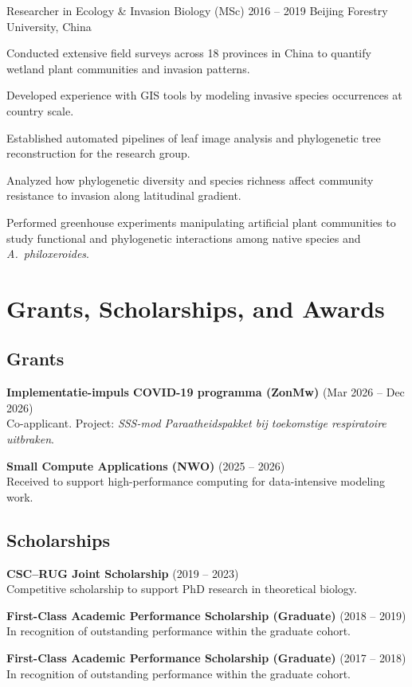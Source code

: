 \cventry
  {Researcher in Ecology \& Invasion Biology (MSc)}
  {2016 -- 2019}
  {Beijing Forestry University, China}
  {%
   \begin{expitem}
     \item Conducted extensive field surveys across 18 provinces in China to quantify wetland plant communities and invasion patterns.
     \item Developed experience with GIS tools by modeling invasive species occurrences at country scale.
     \item Established automated pipelines of leaf image analysis and phylogenetic tree reconstruction for the research group. 
     \item Analyzed how phylogenetic diversity and species richness affect community resistance to invasion along latitudinal gradient.
     \item Performed greenhouse experiments manipulating artificial plant communities to study functional and phylogenetic interactions among native species and \emph{A.~philoxeroides}.
   \end{expitem}
  }

\section*{Grants, Scholarships, and Awards}
\subsection*{Grants}
\begin{expitem}
\item \textbf{Implementatie-impuls COVID-19 programma (ZonMw)} (Mar 2026 -- Dec 2026)\\
      Co-applicant. Project: \emph{SSS-mod Paraatheidspakket bij toekomstige respiratoire uitbraken}.
  \item \textbf{Small Compute Applications (NWO)} (2025 -- 2026)\\
        Received to support high-performance computing for data-intensive modeling work.
\end{expitem}
\subsection*{Scholarships}
\begin{expitem}
  \item \textbf{CSC--RUG Joint Scholarship} (2019 -- 2023)\\
        Competitive scholarship to support PhD research in theoretical biology.
  \item \textbf{First-Class Academic Performance Scholarship (Graduate)} (2018 -- 2019)\\
        In recognition of outstanding performance within the graduate cohort.
  \item \textbf{First-Class Academic Performance Scholarship (Graduate)} (2017 -- 2018)\\
        In recognition of outstanding performance within the graduate cohort.
\end{expitem}
